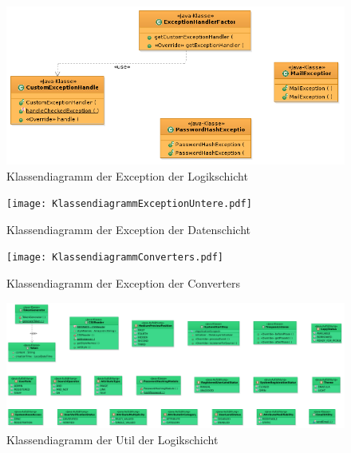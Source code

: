 \documentclass{article}
\begin{document}
\begin{center}
    \begin{figure}[H]
	\hypertarget{ExceptionHandler}{}
        \includegraphics[scale=0.7]{LogikExceptions.png}
        \caption{Klassendiagramm der Exception der Logikschicht }
        \label{fig:Exceptions- Klassendiagramm}
    \end{figure}
\end{center}
\begin{center}
    \begin{figure}[H]
        \texttt{[image: KlassendiagrammExceptionUntere.pdf]}
        \caption{Klassendiagramm der Exception der Datenschicht }
        \label{fig:Dtos- Klassendiagramm}
    \end{figure}
\end{center}

\begin{center}
    \begin{figure}[H]
        \texttt{[image: KlassendiagrammConverters.pdf]}
        \caption{Klassendiagramm der Exception der Converters }
        \label{fig:Dtos- Klassendiagramm}
    \end{figure}
\end{center}

\begin{center}
    \begin{figure}[H]
	\hypertarget{PhaseListener}{}
	\hypertarget{Hash}{}
        \includegraphics[scale=0.4]{KlassendiagrammUtilObere.pdf}
        \caption{Klassendiagramm der Util der Logikschicht }
        \label{fig:Util-logik Klassendiagramm}
    \end{figure}
\end{center}
\end{document}
